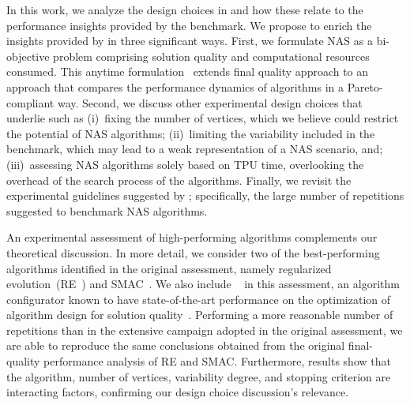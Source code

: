 In this work, we analyze the design choices in \nasbench and how these relate to the performance insights provided by the benchmark. We propose to enrich the insights provided by \nasbench in three significant ways. First, we formulate NAS as a bi-objective problem comprising solution quality and computational resources consumed. This anytime formulation~\cite{LopStu2013ejor} extends \nasbench final quality approach to an approach that compares the performance dynamics of algorithms in a Pareto-compliant way. Second, we discuss other experimental design choices that underlie \nasbench such as (i)~fixing the number of vertices, which we believe could restrict the potential of NAS algorithms; (ii)~limiting the variability included in the benchmark, which may lead to a weak representation of a NAS scenario, and; (iii)~assessing NAS algorithms solely based on TPU time, overlooking the overhead of the search process of the algorithms. Finally, we revisit the experimental guidelines suggested by \nasbench; specifically, the large number of repetitions suggested to benchmark NAS algorithms. %

An experimental assessment of high-performing algorithms complements our theoretical discussion. In more detail, we consider two of the best-performing algorithms identified in the original \nasbench assessment, namely regularized evolution~(RE~\cite{ReaAggHuaLe2019re}) and SMAC~\cite{HutHooLey2011lion}. We also include \irace~\cite{LopDubPerStuBir2016irace} in this assessment, an algorithm configurator known to have state-of-the-art performance on the optimization of algorithm design for solution quality~\cite{BezLopStu2020chapter}. Performing a more reasonable number of repetitions than in the extensive campaign adopted in the original \nasbench assessment, we are able to reproduce the same conclusions obtained from the original final-quality performance analysis of RE and SMAC. Furthermore, results show that the algorithm, number of vertices, variability degree, and stopping criterion are interacting factors, confirming our design choice discussion's relevance. 

